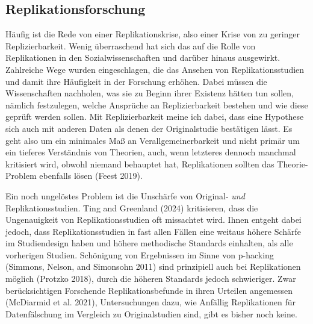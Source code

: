 \documentclass[
  letterpaper,
  DIV=11,
  numbers=noendperiod]{scrreprt}
\begin{document}
\subsection{Replikationsforschung}\label{replikationsforschung}

Häufig ist die Rede von einer Replikationskrise, also einer Krise von zu
geringer Replizierbarkeit. Wenig überraschend hat sich das auf die Rolle
von Replikationen in den Sozialwissenschaften und darüber hinaus
ausgewirkt. Zahlreiche Wege wurden eingeschlagen, die das Ansehen von
Replikationsstudien und damit ihre Häufigkeit in der Forschung erhöhen.
Dabei müssen die Wissenschaften nachholen, was sie zu Beginn ihrer
Existenz hätten tun sollen, nämlich festzulegen, welche Ansprüche an
Replizierbarkeit bestehen und wie diese geprüft werden sollen. Mit
Replizierbarkeit meine ich dabei, dass eine Hypothese sich auch mit
anderen Daten als denen der Originalstudie bestätigen lässt. Es geht
also um ein minimales Maß an Verallgemeinerbarkeit und nicht primär um
ein tieferes Verständnis von Theorien, auch, wenn letzteres dennoch
manchmal kritisiert wird, obwohl niemand behauptet hat, Replikationen
sollten das Theorie-Problem ebenfalls lösen (Feest 2019).

\begin{tcolorbox}[enhanced jigsaw, title=\textcolor{quarto-callout-note-color}{\faInfo}\hspace{0.5em}{Unschärfe von Replikationsstudien}, colbacktitle=quarto-callout-note-color!10!white, rightrule=.15mm, titlerule=0mm, left=2mm, bottomrule=.15mm, arc=.35mm, leftrule=.75mm, toprule=.15mm, opacityback=0, breakable, bottomtitle=1mm, colframe=quarto-callout-note-color-frame, toptitle=1mm, opacitybacktitle=0.6, coltitle=black, colback=white]

Ein noch ungelöstes Problem ist die Unschärfe von Original- \emph{und}
Replikationsstudien. Ting and Greenland (2024) kritisieren, dass die
Ungenauigkeit von Replikationsstudien oft missachtet wird. Ihnen entgeht
dabei jedoch, dass Replikationsstudien in fast allen Fällen eine weitaus
höhere Schärfe im Studiendesign haben und höhere methodische Standards
einhalten, als alle vorherigen Studien. Schönigung von Ergebnissen im
Sinne von p-hacking (Simmons, Nelson, and Simonsohn 2011) sind
prinzipiell auch bei Replikationen möglich (Protzko 2018), durch die
höheren Standards jedoch schwieriger. Zwar berücksichtigen Forschende
Replikationsbefunde in ihren Urteilen angemessen (McDiarmid et al.
2021), Untersuchungen dazu, wie Anfällig Replikationen für
Datenfälschung im Vergleich zu Originalstudien sind, gibt es bisher noch
keine.

\end{tcolorbox}
\end{document}
